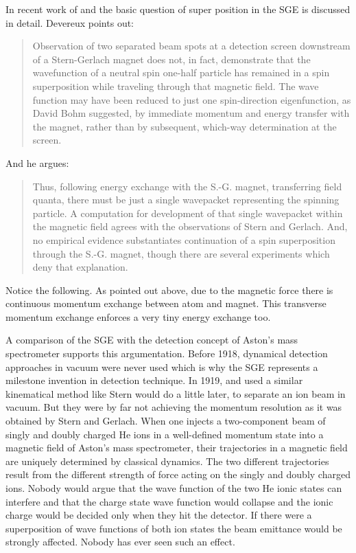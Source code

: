 \documentclass[12pt]{article}
\begin{document}
In recent work of \cite{DevereuxM2015Reduction} and \cite{WennerstroemHEtal2012experiment,WennerstroemHEtal2013measurements,WennerstroemHEtal2014Interpretation} the basic question of super position in the SGE is discussed in detail. Devereux points out: 
\begin{quote}
Observation of two separated beam spots at a detection screen downstream of a Stern-Gerlach magnet does not, in fact, demonstrate that the wavefunction of a neutral spin one-half particle has remained in a spin superposition while traveling through that magnetic field. The wave function may have been reduced to just one spin-direction eigenfunction, as David Bohm suggested, by immediate momentum and energy transfer with the magnet, rather than by subsequent, which-way determination at the screen. 
\end{quote}
And he argues:
\begin{quote}
Thus, following energy exchange with the S.-G. magnet, transferring field quanta, there must be just a single wavepacket representing the spinning particle.  A computation for development of that single wavepacket within the magnetic field agrees with the observations of Stern and Gerlach. And, no empirical evidence substantiates continuation of a spin superposition through the S.-G. magnet, though there are several experiments which deny that explanation. 
\end{quote}
Notice the following. As pointed out above, due to the magnetic force there is continuous momentum exchange between atom and magnet. This transverse momentum exchange enforces a very tiny energy exchange too.

A comparison of the SGE with the detection concept of Aston's mass spectrometer supports this argumentation. Before 1918, dynamical detection approaches in vacuum were never used which is why the SGE represents a milestone invention in detection technique. In 1919, \cite{DempsterAJ1918Method} and \cite{AstonF1919Spectrograph} used a similar kinematical method like Stern would do a little later, to separate an ion beam in vacuum. But they were by far not achieving the momentum resolution as it was obtained by Stern and Gerlach. When one injects a two-component beam of singly and doubly charged He ions in a well-defined momentum state into a magnetic field of Aston's mass spectrometer, their trajectories in a magnetic field are uniquely determined by classical dynamics. The two different trajectories result from the different strength of force acting on the singly and doubly charged ions. Nobody would argue that the wave function of the two He ionic states can interfere and that the charge state wave function would collapse and the ionic charge would be decided only when they hit the detector. If there were a superposition of wave functions of both ion states the beam emittance would be strongly affected. Nobody has ever seen such an effect. 
\end{document}
